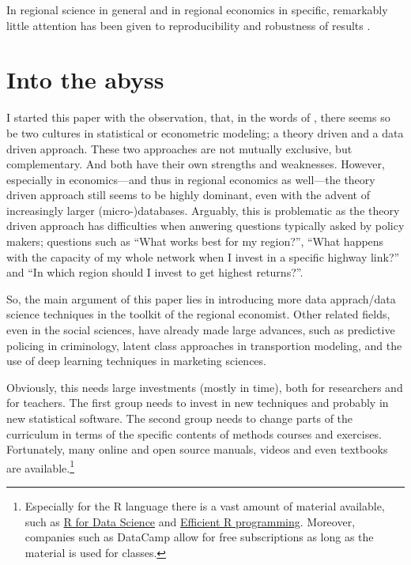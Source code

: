 \documentclass[fleqn,10pt]{SelfArx} %
\begin{document}
In regional science in general and in regional economics in specific, remarkably little attention has been given to reproducibility and robustness of results \citep[with some exceptions as, amongst some others, by][]{Rey:2014cl,arribas2015woow, Arribas2016}.

\citet{schwabish2014economist}

\section{Into the abyss}

I started this paper with the observation, that, in the words of
\citet{breiman2001statistical}, there seems so be two cultures in statistical or
econometric modeling; a theory driven and a data driven approach. These two
approaches are not mutually exclusive, but complementary. And both have their
own strengths and weaknesses. However, especially in economics---and thus in
regional economics as well---the theory driven approach still seems to be highly
dominant, even with the advent of increasingly larger (micro-)databases.
Arguably, this is problematic as the theory driven approach has difficulties when anwering questions typically
asked by policy makers; questions such as ``What works best for my region?'',
``What happens with the capacity of my whole network when I invest in a specific
highway link?'' and ``In which region should I invest to get highest returns?''.

So, the main argument of this paper lies in introducing more data apprach/data
science techniques in the toolkit of the regional economist. Other related fields, even
in the social sciences, have already made large advances, such as predictive
policing in criminology, latent class approaches in transportion modeling, and
the use of deep learning techniques in marketing sciences. 

Obviously, this needs large investments (mostly in time), both for researchers
and for teachers. The first group needs to invest in new techniques and probably
in new statistical software. The second group needs to change parts of the
curriculum in terms of the specific contents of methods courses and exercises.
Fortunately, many online and open source manuals, videos and even textbooks are
available.\footnote{Especially for the R language there is a vast amount of
  material available, such as \href{http://r4ds.had.co.nz/}{R for Data Science}
  and \href{https://csgillespie.github.io/efficientR/}{Efficient R programming}.
Moreover, companies such as DataCamp allow for free subscriptions as long as the
material is used for classes.} 
\end{document}
